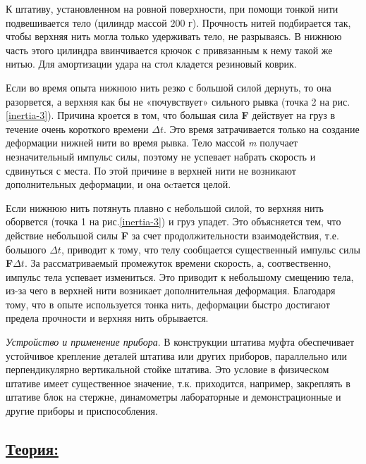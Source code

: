 \documentclass[14pt,a4paper,oneside]{extarticle}	%
\begin{document}
К штативу, установленном на ровной поверхности, при помощи тонкой нити подвешивается тело (цилиндр массой $ 200 $ г).
Прочность нитей подбирается так, чтобы верхняя нить могла только удерживать тело, не разрываясь.
В нижнюю часть этого цилиндра ввинчивается крючок с привязанным к нему такой же нитью.
Для амортизации удара на стол кладется резиновый коврик.

Если во время опыта нижнюю нить резко с большой силой дернуть, то она разорвется, а верхняя как бы не «почувствует» сильного рывка (точка 2 на рис.\ref{inertia-3}). 
Причина кроется в том, что большая сила \textbf{F} действует на груз в течение очень короткого времени $ \Delta t $. 
Это время затрачивается только на создание деформации нижней нити во время рывка. 
Тело массой \textit{m} получает незначительный импульс силы, поэтому не успевает набрать скорость и сдвинуться с места.
По этой причине в верхней нити не возникают дополнительных деформации, и она оcтается целой. 

Если нижнюю нить потянуть плавно с небольшой силой, то верхняя нить оборвется (точка 1 на рис.\ref{inertia-3}) и груз упадет.
Это объясняется тем, что действие небольшой силы \textbf{F} за счет продолжительности взаимодействия, т.е. большого $ \Delta t $, приводит к тому, что телу сообщается существенный импульс силы \textbf{F}$ \Delta t $.
За рассматриваемый промежуток времени скорость, а, соотвественно, импульс тела успевает измениться. 
Это приводит к небольшому смещению тела, из-за чего в верхней нити возникает дополнительная деформация.
Благодаря тому, что в опыте используется тонка нить, деформации быстро достигают предела прочности и верхняя нить обрывается. 

\textit{Устройство и применение прибора}. В конструкции штатива муфта обеспечивает устойчивое крепление деталей штатива или других приборов, параллельно или перпендикулярно вертикальной стойке штатива.
Это условие в физическом штативе имеет существенное значение, т.к. приходится, например, закреплять в штативе блок на стержне, динамометры лабораторные и демонстрационные и другие приборы и приспособления.


\newpage
\subsection*{\underline{Теория:}}
\end{document}
